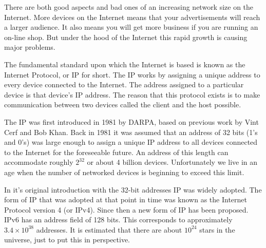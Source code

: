 %

There are both good aspects and bad ones of an increasing network size on the Internet. More devices on the Internet
means that your advertisements will reach a larger audience. It also means you will get more business if 
you are running an on-line shop. But under the hood of the Internet this rapid growth is causing major problems. 


The fundamental standard upon which the Internet is based is known as the Internet Protocol, or IP for short. The IP works by assigning a unique address to every device connected to the Internet. The address assigned to a particular device is that device's IP address. The reason that this protocol exists is to make communication between two devices called the client and the host possible. 


The IP was first introduced in 1981 by DARPA\cite{rfc0791}, based on previous work by Vint Cerf and Bob Khan\cite{1092259}. Back in 1981 it was assumed that an address of 32 bits (1's and 0's) was large enough to assign a unique IP address to all devices connected to the Internet for the foreseeable future. An address of this length can accommodate roughly $2^{32}$ or about 4 billion devices. Unfortunately we live in an age when the number of networked devices is beginning to exceed this limit.


In it's original introduction with the 32-bit addresses IP was widely adopted. The form of IP that was adopted at that point in time was known as the Internet Protocol version 4 (or IPv4). Since then a new form of IP has been proposed\cite{rfc1883}\cite{rfc2460}. IPv6 has an address field of 128 bits. This corresponds to approximately $3.4 \times 10^{38}$ addresses. It is estimated that there are about $10^{24}$ stars in the universe, just to put this in perspective.





   